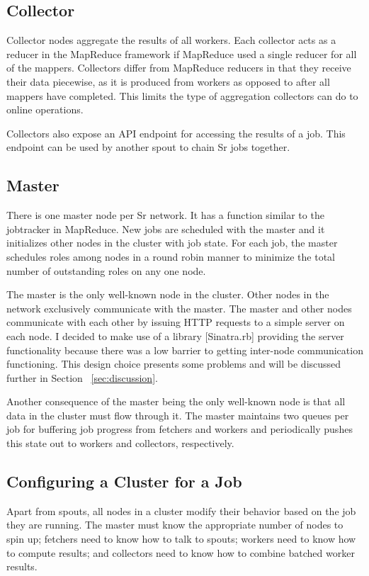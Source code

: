 \documentclass[12pt]{article}
\begin{document}
\subsection{Collector}
Collector nodes aggregate the results of all workers. Each collector acts as a reducer in the MapReduce framework if MapReduce used a single reducer for all of the mappers. Collectors differ from MapReduce reducers in that they receive their data piecewise, as it is produced from workers as opposed to after all mappers have completed. This limits the type of aggregation collectors can do to online operations.

Collectors also expose an API endpoint for accessing the results of a job. This endpoint can be used by another spout to chain Sr jobs together.
\subsection{Master}
There is one master node per Sr network. It has a function similar to the jobtracker in MapReduce. New jobs are scheduled with the master and it initializes other nodes in the cluster with job state. For each job, the master schedules roles among nodes in a round robin manner to minimize the total number of outstanding roles on any one node.

The master is the only well-known node in the cluster. Other nodes in the network exclusively communicate with the master. The master and other nodes communicate with each other by issuing HTTP requests to a simple server on each node. I decided to make use of a library [Sinatra.rb] providing the server functionality because there was a low barrier to getting inter-node communication functioning. This design choice presents some problems and will be discussed further in Section ~\ref{sec:discussion}.

Another consequence of the master being the only well-known node is that all data in the cluster must flow through it. The master maintains two queues per job for buffering job progress from fetchers and workers and periodically pushes this state out to workers and collectors, respectively.
\subsection{Configuring a Cluster for a Job}
Apart from spouts, all nodes in a cluster modify their behavior based on the job they are running. The master must know the appropriate number of nodes to spin up; fetchers need to know how to talk to spouts; workers need to know how to compute results; and collectors need to know how to combine batched worker results.
\end{document}
